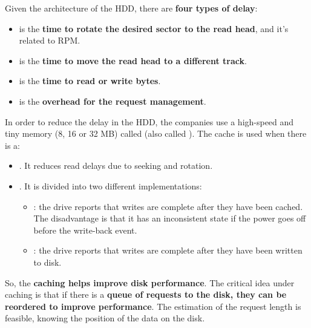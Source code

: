 Given the architecture of the HDD, there are \textbf{four types of delay}:
\begin{itemize}\label{four types of hdd delay}
    \item {} is the \textbf{time to rotate the desired sector to the read head}, and it's related to RPM.
    \item {} is the \textbf{time to move the read head to a different track}.
    \item {} is the \textbf{time to read or write bytes}.
    \item {} is the \textbf{overhead for the request management}.
\end{itemize}
In order to reduce the delay in the HDD, the companies use a high-speed and tiny memory (8, 16 or 32 MB) called  (also called ). The cache is used when there is a:
\begin{itemize}
    \item {}. It reduces read delays due to seeking and rotation.
    
    \item {}. It is divided into two different implementations:
    \begin{itemize}
        \item {}: the drive reports that writes are complete after they have been cached. The disadvantage is that it has an inconsistent state if the power goes off before the write-back event.
        
        \item {}: the drive reports that writes are complete after they have been written to disk.
    \end{itemize}
\end{itemize}
So, the \textbf{caching helps improve disk performance}. The critical idea under caching is that if there is a \textbf{queue of requests to the disk, they can be reordered to improve performance}. The estimation of the request length is feasible, knowing the position of the data on the disk.

\newpage

